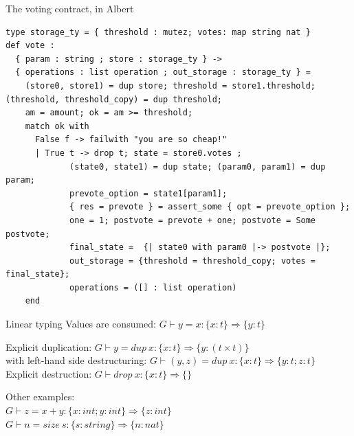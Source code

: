 \documentclass[aspectratio=169]{beamer}
\begin{document}
\begin{frame}[fragile]{The voting contract, in Albert}
\begin{lstlisting}[language=albert,basicstyle=\footnotesize]
type storage_ty = { threshold : mutez; votes: map string nat }
def vote :
  { param : string ; store : storage_ty } ->
  { operations : list operation ; out_storage : storage_ty } =
    (store0, store1) = dup store; threshold = store1.threshold; (threshold, threshold_copy) = dup threshold;
    am = amount; ok = am >= threshold;
    match ok with
      False f -> failwith "you are so cheap!"
      | True t -> drop t; state = store0.votes ;
             (state0, state1) = dup state; (param0, param1) = dup param;
             prevote_option = state1[param1];
             { res = prevote } = assert_some { opt = prevote_option };
             one = 1; postvote = prevote + one; postvote = Some postvote;
             final_state =  {| state0 with param0 |-> postvote |};
             out_storage = {threshold = threshold_copy; votes = final_state};
             operations = ([] : list operation)
    end
\end{lstlisting}
\end{frame}

\begin{frame}{Linear typing}
  Values are consumed: $G \vdash y = x : \{ x : t \} \Rightarrow \{ y : t \} $

  Explicit duplication: $G \vdash y = dup\:x : \{ x : t \} \Rightarrow \{ y : (t \times t) \}$\\
  with left-hand side destructuring: $G \vdash (y, z) = dup\:x : \{ x : t \} \Rightarrow \{ y : t; z : t \}$\\
  Explicit destruction: $G \vdash drop\:x : \{ x : t \} \Rightarrow \{\}$

  Other examples:\\
  $G \vdash z = x + y : \{ x : int ; y : int \} \Rightarrow \{ z : int \}$\\
  $G \vdash n = size\:s : \{ s : string \} \Rightarrow \{ n : nat \}$
\end{frame}
\end{document}
